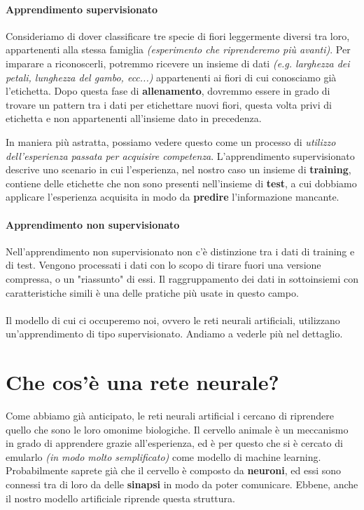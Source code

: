 \documentclass[12pt, twoside, letterpaper]{report}
\begin{document}
				\paragraph{Apprendimento supervisionato} Consideriamo di dover classificare tre specie di fiori leggermente diversi tra loro, appartenenti alla stessa famiglia \textit{(esperimento che riprenderemo più avanti)}. Per imparare a riconoscerli, potremmo ricevere un insieme di dati \textit{(e.g. larghezza dei petali, lunghezza del gambo, ecc...)} appartenenti ai fiori di cui conosciamo già l'etichetta. Dopo questa fase di \textbf{allenamento}, dovremmo essere in grado di trovare un pattern tra i dati per etichettare nuovi fiori, questa volta privi di etichetta e non appartenenti all'insieme dato in precedenza. 
				
					In maniera più astratta, possiamo vedere questo come un processo di \textit{utilizzo dell'esperienza passata per acquisire competenza}. L'apprendimento supervisionato descrive uno scenario in cui l'esperienza, nel nostro caso un insieme di \textbf{training}, contiene delle etichette che non sono presenti nell'insieme di \textbf{test}, a cui dobbiamo applicare l'esperienza acquisita in modo da \textbf{predire} l'informazione mancante.
				
				\paragraph{Apprendimento non supervisionato}  Nell'apprendimento non supervisionato non c'è distinzione tra i dati di training e di test. Vengono processati i dati con lo scopo di tirare fuori una versione compressa, o un "riassunto" di essi. Il raggruppamento dei dati in sottoinsiemi con caratteristiche simili è una delle pratiche più usate in questo campo.\\\\
				Il modello di cui ci occuperemo noi, ovvero le reti neurali artificiali, utilizzano un'apprendimento di tipo supervisionato. Andiamo a vederle più nel dettaglio.
			
		\section{Che cos'è una rete neurale?}
			Come abbiamo già anticipato, le reti neurali artificial	i cercano di riprendere quello che sono le loro omonime biologiche. Il cervello animale è un meccanismo in grado di apprendere grazie all'esperienza, ed è per questo che si è cercato di emularlo \textit{(in modo molto semplificato)} come modello di machine learning. Probabilmente saprete già che il cervello è composto da \textbf{neuroni}, ed essi sono connessi tra di loro da delle \textbf{sinapsi} in modo da poter comunicare. Ebbene, anche il nostro modello artificiale riprende questa struttura.
			
\end{document}
